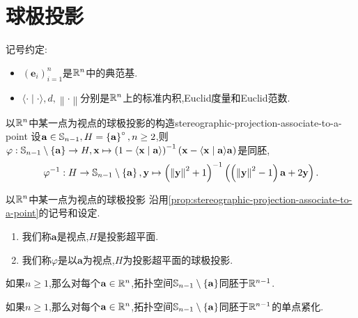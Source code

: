 \section{球极投影}

记号约定:
\begin{itemize}
	\item $\left(\mathbf{e}_{i}\right)_{i=1}^{n}$是$\R^{n}$中的典范基.
	\item $\langle\cdot\mid\cdot\rangle,d,\left\|\cdot\right\|$分别是$\R^{n}$上的标准内积,Euclid度量和Euclid范数.
\end{itemize}

\begin{proposition}{以$\R^{n}$中某一点为视点的球极投影的构造}{stereographic-projection-associate-to-a-point}
	设$\mathbf{a}\in\S_{n-1},H=\left\{\mathbf{a}\right\}^{\circ},n\geq 2$,则$\varphi:\S_{n-1}\setminus\left\{\mathbf{a}\right\}\to H,\mathbf{x}\mapsto\left(1-\langle\mathbf{x}\mid\mathbf{a}\rangle\right)^{-1}\left(\mathbf{x}-\langle\mathbf{x}\mid\mathbf{a}\rangle\mathbf{a}\right)$是同胚,
	\begin{align*}
		\varphi^{-1}:H\to\S_{n-1}\setminus\left\{\mathbf{a}\right\},\mathbf{y}\mapsto \left(\left\|\mathbf{y}\right\|^{2}+1\right)^{-1}\left(\left(\left\|\mathbf{y}\right\|^{2}-1\right)\mathbf{a}+2\mathbf{y}\right).
	\end{align*}
\end{proposition}

\begin{definition}{以$\R^{n}$中某一点为视点的球极投影}{}
	沿用\cref{prop:stereographic-projection-associate-to-a-point}的记号和设定.
	\begin{enumerate}
		\item 我们称$\mathbf{a}$是视点,$H$是投影超平面.
		\item 我们称$\varphi$是以$\mathbf{a}$为视点,$H$为投影超平面的球极投影.
	\end{enumerate}
\end{definition}

\begin{proposition}{}{}
	如果$n\geq 1$,那么对每个$\mathbf{a}\in\R^{n}$,拓扑空间$\S_{n-1}\setminus\left\{\mathbf{a}\right\}$同胚于$\R^{n-1}$.
\end{proposition}

\begin{proposition}{}{}
	如果$n\geq 1$,那么对每个$\mathbf{a}\in\R^{n}$,拓扑空间$\S_{n-1}\setminus\left\{\mathbf{a}\right\}$同胚于$\R^{n-1}$的单点紧化.
\end{proposition}

